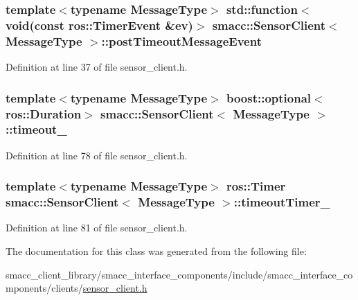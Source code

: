 \subsubsection[{\texorpdfstring{post\+Timeout\+Message\+Event}{postTimeoutMessageEvent}}]{\setlength{\rightskip}{0pt plus 5cm}template$<$typename Message\+Type$>$ std\+::function$<$void(const ros\+::\+Timer\+Event \&ev)$>$ {\bf smacc\+::\+Sensor\+Client}$<$ Message\+Type $>$\+::post\+Timeout\+Message\+Event}\hypertarget{classsmacc_1_1SensorClient_ad2c6d9f2e7ceddac26024cd5901a6739}{}\label{classsmacc_1_1SensorClient_ad2c6d9f2e7ceddac26024cd5901a6739}


Definition at line 37 of file sensor\+\_\+client.\+h.

\subsubsection[{\texorpdfstring{timeout\+\_\+}{timeout_}}]{\setlength{\rightskip}{0pt plus 5cm}template$<$typename Message\+Type$>$ boost\+::optional$<$ros\+::\+Duration$>$ {\bf smacc\+::\+Sensor\+Client}$<$ Message\+Type $>$\+::timeout\+\_\+}\hypertarget{classsmacc_1_1SensorClient_a660452b6940625d3c60581961124ebd8}{}\label{classsmacc_1_1SensorClient_a660452b6940625d3c60581961124ebd8}


Definition at line 78 of file sensor\+\_\+client.\+h.

\subsubsection[{\texorpdfstring{timeout\+Timer\+\_\+}{timeoutTimer_}}]{\setlength{\rightskip}{0pt plus 5cm}template$<$typename Message\+Type$>$ ros\+::\+Timer {\bf smacc\+::\+Sensor\+Client}$<$ Message\+Type $>$\+::timeout\+Timer\+\_\+\hspace{0.3cm}{\ttfamily [private]}}\hypertarget{classsmacc_1_1SensorClient_a5a82e2fa1f0ccfe2564125fae2f9783a}{}\label{classsmacc_1_1SensorClient_a5a82e2fa1f0ccfe2564125fae2f9783a}


Definition at line 81 of file sensor\+\_\+client.\+h.



The documentation for this class was generated from the following file\+:\begin{DoxyCompactItemize}
\item 
smacc\+\_\+client\+\_\+library/smacc\+\_\+interface\+\_\+components/include/smacc\+\_\+interface\+\_\+components/clients/\hyperlink{sensor__client_8h}{sensor\+\_\+client.\+h}\end{DoxyCompactItemize}
